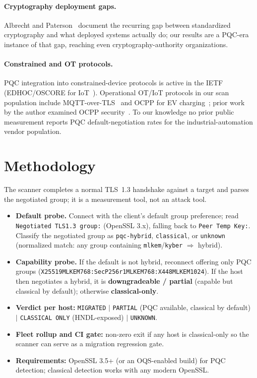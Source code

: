 \documentclass[11pt]{article}
\newcommand{\code}[1]{\texttt{#1}}
\begin{document}
\paragraph{Cryptography deployment gaps.}
Albrecht and Paterson~\cite{albrecht2024wild} document the recurring gap between
standardized cryptography and what deployed systems actually do; our results are a
PQC-era instance of that gap, reaching even cryptography-authority organizations.

\paragraph{Constrained and OT protocols.}
PQC integration into constrained-device protocols is active in the IETF (EDHOC/OSCORE
for IoT~\cite{rfc9528}). Operational OT/IoT protocols in our scan population include
MQTT-over-TLS~\cite{mqtt5} and OCPP for EV charging~\cite{ocpp201}; prior work by the
author examined OCPP security~\cite{shaik2025ocpp}. To our knowledge no prior public
measurement reports PQC default-negotiation rates for the industrial-automation vendor
population.

\section{Methodology}
\label{sec:method}

The scanner completes a normal TLS~1.3 handshake against a target and parses the
negotiated group; it is a measurement tool, not an attack tool.

\begin{itemize}
  \item \textbf{Default probe.} Connect with the client's default group preference;
        read \code{Negotiated TLS1.3 group:} (OpenSSL 3.x), falling back to
        \code{Peer Temp Key:}. Classify the negotiated group as \code{pqc-hybrid},
        \code{classical}, or \code{unknown} (normalized match: any group containing
        \code{mlkem}/\code{kyber} $\Rightarrow$ hybrid).
  \item \textbf{Capability probe.} If the default is not hybrid, reconnect offering only
        PQC groups (\code{X25519MLKEM768:SecP256r1MLKEM768:X448MLKEM1024}). If the host
        then negotiates a hybrid, it is \textbf{downgradeable / partial} (capable but
        classical by default); otherwise \textbf{classical-only}.
  \item \textbf{Verdict per host:} \code{MIGRATED} $\mid$ \code{PARTIAL} (PQC available,
        classical by default) $\mid$ \code{CLASSICAL ONLY} (HNDL-exposed) $\mid$
        \code{UNKNOWN}.
  \item \textbf{Fleet rollup and CI gate:} non-zero exit if any host is classical-only
        so the scanner can serve as a migration regression gate.
  \item \textbf{Requirements:} OpenSSL 3.5+ (or an OQS-enabled build) for PQC detection;
        classical detection works with any modern OpenSSL.
\end{itemize}
\end{document}
